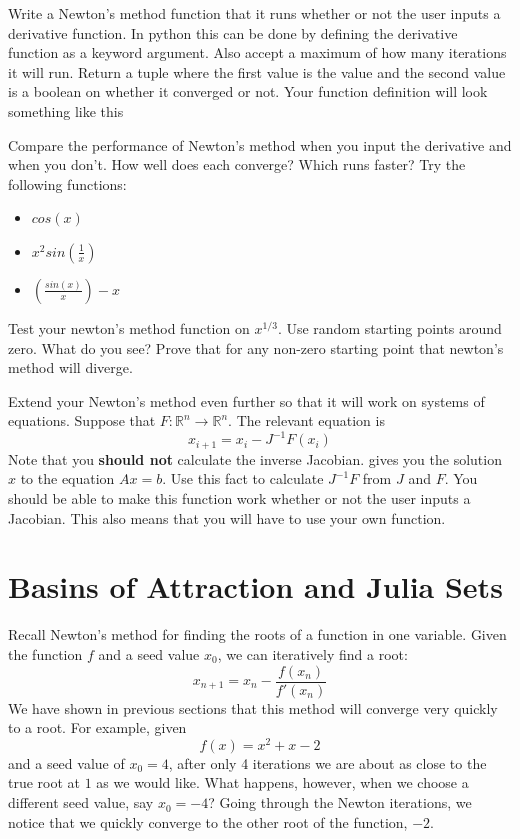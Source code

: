 \begin{problem}
Write a Newton's method function that it runs whether or not the user inputs a derivative function.
In python this can be done by defining the derivative function as a keyword argument.
Also accept a maximum of how many iterations it will run.
Return a tuple where the first value is the value and the second value is a boolean on whether it converged or not.
Your function definition will look something like this 

Compare the performance of Newton's method when you input the derivative and when you don't.
How well does each converge?
Which runs faster?
Try the following functions:

\begin{itemize}
\item $cos(x)$
\item $x^2sin(\frac{1}{x})$
\item $(\frac{sin(x)}{x})-x$
\end{itemize}
\end{problem}

\begin{problem}
Test your newton's method function on $x^{1/3}$.
Use random starting points around zero.
What do you see?
Prove that for any non-zero starting point that newton's method will diverge.
\end{problem}

\begin{problem}
Extend your Newton's method even further so that it will work on systems of equations.
Suppose that $F: \mathbb{R}^n \rightarrow \mathbb{R}^n $.
The relevant equation is
\[
x_{i+1} = x_i - J^{-1}F(x_i)
\]
Note that you {\bf should not} calculate the inverse Jacobian.
 gives you the solution $x$ to the equation $Ax=b$.
Use this fact to calculate $J^{-1}F$ from $J$ and $F$.
You should be able to make this function work whether or not the user inputs a Jacobian.
This also means that you will have to use your own  function.
\end{problem}

\section*{Basins of Attraction and Julia Sets}
Recall Newton's method for finding the roots of a function in one variable.
Given the function $f$ and a seed value $x_0$, we can iteratively find a root:
\[
x_{n+1} = x_n - \frac{f(x_n)}{f'(x_n)}
\]
We have shown in previous sections that this method will converge very quickly to a root.
For example, given
\[
f(x) = x^2 + x -2
\]
and a seed value of $x_0 = 4$, after only 4 iterations we are about as close to the true root at $1$ as we would like.
What happens, however, when we choose a different seed value, say $x_0 = -4$?
Going through the Newton iterations, we notice that we quickly converge to the other root of the function, $-2$.


